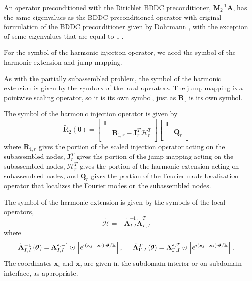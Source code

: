 \documentclass[review]{siamart190516}
\begin{document}
An operator preconditioned with the Dirichlet BDDC preconditioner, $\mathbf{M}^{-1}_2 \mathbf{A}$, has the same eigenvalues as the BDDC preconditioned operator with original formulation of the BDDC preconditioner given by Dohrmann \cite{dohrmann2003preconditioner}, with the exception of some eigenvalues that are equal to $1$ \cite{li2007use}.

For the symbol of the harmonic injection operator, we need the symbol of the harmonic extension and jump mapping.

As with the partially subassembled problem, the symbol of the harmonic extension is given by the symbols of the local operators.
The jump mapping is a pointwise scaling operator, so it is its own symbol, just as $\mathbf{R}_1$ is its own symbol.

\begin{definition}
The symbol of the harmonic injection operator is given by
\begin{equation}
\tilde{\mathbf{R}}_2 \left( \boldsymbol{\theta} \right) =
\begin{bmatrix}
\mathbf{I} &                                                                  \\
           & \mathbf{R}_{1, r} - \mathbf{J}^T_r \boldsymbol{\mathcal{H}}^T_r  \\
\end{bmatrix}
\begin{bmatrix}
\mathbf{I} &                 \\
           & \mathbf{Q}_{r}  \\
\end{bmatrix}
\end{equation}
where $\mathbf{R}_{1, r}$ gives the portion of the scaled injection operator acting on the subassembled nodes, $\mathbf{J}^T_r$ gives the portion of the jump mapping acting on the subassembled nodes, $\boldsymbol{\mathcal{H}}^T_r$ gives the portion of the harmonic extension acting on subassembled nodes, and $\mathbf{Q}_r$ gives the portion of the Fourier mode localization operator that localizes the Fourier modes on the subassembled nodes.

The symbol of the harmonic extension is given by the symbols of the local operators,
\begin{equation}
\tilde{\boldsymbol{\mathcal{H}}} = - \tilde{\mathbf{A}}_{I, I}^{-1} \tilde{\mathbf{A}}_{\Gamma, I}^T
\end{equation}
where
\begin{equation}
\tilde{\mathbf{A}}_{I, I}^{-1} \left( \boldsymbol{\theta} \right) = \mathbf{A}_{I, I}^{e, -1} \odot \left[ e^{\imath \left( \mathbf{x}_j - \mathbf{x}_i \right) \cdot \boldsymbol{\theta} / \mathbf{h}} \right],
\hspace{5mm}
\tilde{\mathbf{A}}_{\Gamma, I}^T \left( \boldsymbol{\theta} \right) = \mathbf{A}_{\Gamma, I}^{e, T} \odot \left[ e^{\imath \left( \mathbf{x}_j - \mathbf{x}_i \right) \cdot \boldsymbol{\theta} / \mathbf{h}} \right].
\end{equation}
The coordinates $\mathbf{x}_i$ and $\mathbf{x}_j$ are given in the subdomain interior or on subdomain interface, as appropriate.


\end{definition}
\end{document}

